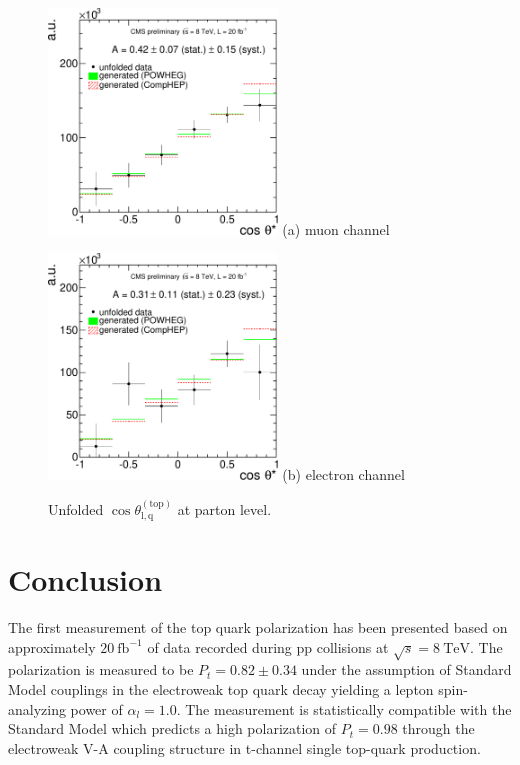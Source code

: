 \documentclass[a4paper]{jpconf}
\newcommand{\unit}[1]{\ensuremath{\mathrm{~#1}}}
\newcommand{\costheta}[0]{\cos\theta_{\mathrm{l,q}}^{\mathrm{(top)}}}
\begin{document}
\begin{figure}[h]
\begin{center}
\begin{minipage}{7cm}
\includegraphics[height=6cm]{costheta_unfolded_mu-crop}
\center (a) muon channel
\end{minipage}\hspace{1cm}%
\begin{minipage}{7cm}
\includegraphics[height=6cm]{costheta_unfolded_el-crop}
\center (b) electron channel
\end{minipage} 
\caption{\label{fig:unfoldcostheta}Unfolded $\costheta$ at parton level.}
\end{center}
\vspace{-0.5cm}
\end{figure}

\section{Conclusion}
The first measurement of the top quark polarization has been presented based on approximately $20\unit{fb^{-1}}$ of data recorded during pp collisions at $\sqrt{s}=8\unit{TeV}$.
The polarization is measured to be $P_{t}=0.82 \pm 0.34$ under the assumption of Standard Model couplings in the electroweak top quark decay yielding a lepton spin-analyzing power of $\alpha_{l}=1.0$. The measurement is statistically compatible with the Standard Model which predicts a high polarization of $P_{t}=0.98$ through the electroweak V-A coupling structure in t-channel single top-quark production.
\end{document}
